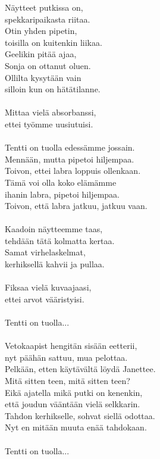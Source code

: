 
Näytteet putkissa on,\\
spekkaripaikasta riitaa.\\
Otin yhden pipetin,\\
toisilla on kuitenkin liikaa.\\
Geelikin pitää ajaa,\\
Sonja on ottanut oluen.\\
Ollilta kysytään vain\\
silloin kun on hätätilanne.\\
\hspace{10mm}\\
Mittaa vielä absorbanssi,\\
ettei työmme uusiutuisi.\\
\hspace{10mm}\\
Tentti on tuolla edessämme jossain.\\
Mennään, mutta pipetoi hiljempaa.\\
Toivon, ettei labra loppuis ollenkaan.\\
Tämä voi olla koko elämämme\\
ihanin labra, pipetoi hiljempaa.\\
Toivon, että labra jatkuu, jatkuu vaan.\\
\hspace{10mm}\\
Kaadoin näytteemme taas,\\
tehdään tätä kolmatta kertaa.\\
Samat virhelaskelmat,\\
kerhiksellä kahvii ja pullaa.\\
\hspace{10mm}\\
Fiksaa vielä kuvaajaasi,\\
ettei arvot vääristyisi.\\
\hspace{10mm}\\
Tentti on tuolla...\\
\hspace{10mm}\\
Vetokaapist hengitän sisään eetterii,\\
nyt päähän sattuu, mua pelottaa.\\
Pelkään, etten käytävältä löydä Janettee.\\
Mitä sitten teen, mitä sitten teen?\\
Eikä ajatella mikä putki on kenenkin,\\
että joudun vääntään vielä selkkarin.\\
Tahdon kerhikselle, sohvat siellä odottaa.\\
Nyt en mitään muuta enää tahdokaan.\\
\hspace{10mm}\\
Tentti on tuolla...\\